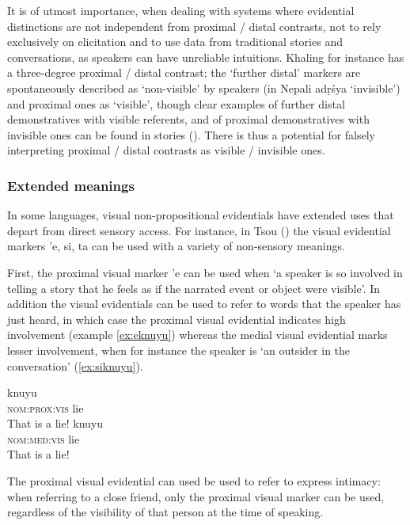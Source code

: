 \documentclass[oneside,a4paper,11pt]{article}
\newcommand{\ipa}[1]{{\phon \mbox{#1}}} %
\begin{document}
It is of utmost importance, when dealing with systems where evidential distinctions are not independent from proximal / distal contrasts, not to rely exclusively on elicitation and to use data from traditional stories and conversations, as speakers can have unreliable intuitions. Khaling for instance has a three-degree proximal / distal contrast; the `further distal' markers are spontaneously described as `non-visible' by speakers (in Nepali \ipa{adṛśya} `invisible') and proximal ones as `visible', though clear examples of further distal demonstratives with visible referents, and of proximal demonstratives with invisible ones can be found in stories (\citealt[399]{jacques14auditory}). There is thus a potential for falsely interpreting proximal / distal contrasts as visible / invisible ones.

\subsubsection{Extended meanings} \label{sec:extended.visible}
In some languages, visual non-propositional evidentials have extended uses that depart from direct sensory access. For instance, in Tsou (\citealt[55-8]{yang00tsou.case}) the visual evidential markers \ipa{'e},  \ipa{si},  \ipa{ta} can be used with a variety of non-sensory meanings. 

First, the proximal visual marker \ipa{'e} can be used when `a speaker is so involved in telling a story that he feels as if the narrated event or object were visible'. In addition the visual evidentials can be used to refer to words that the speaker has just heard, in which case the proximal visual evidential indicates high involvement (example \ref{ex:eknuyu}) whereas the medial visual evidential marks lesser involvement, when for instance the speaker is `an outsider in the conversation' (\ref{ex:siknuyu}).

\begin{exe}
\ex \label{ex:eknuyu}
\gll \ipa{'e} \ipa{knuyu} \\
\textsc{nom:prox:vis} lie \\
\glt That is a lie!
\ex \label{ex:siknuyu}
\gll \ipa{si} \ipa{knuyu} \\
\textsc{nom:med:vis} lie \\
\glt That is a lie!
\end{exe}

The proximal visual evidential can used be used to refer to express intimacy: when referring to a close friend, only the proximal visual marker can be used, regardless of the visibility of that person at the time of speaking.
\end{document}
